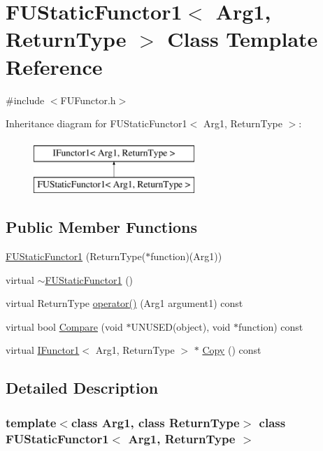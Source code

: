 \hypertarget{classFUStaticFunctor1}{
\section{FUStaticFunctor1$<$ Arg1, ReturnType $>$ Class Template Reference}
\label{classFUStaticFunctor1}
}


{\ttfamily \#include $<$FUFunctor.h$>$}

Inheritance diagram for FUStaticFunctor1$<$ Arg1, ReturnType $>$:\begin{figure}[H]
\begin{center}
\leavevmode
\includegraphics[height=2.000000cm]{classFUStaticFunctor1}
\end{center}
\end{figure}
\subsection*{Public Member Functions}
\begin{DoxyCompactItemize}
\item 
\hyperlink{classFUStaticFunctor1_afa89870510a8d861a9c643e264c98157}{FUStaticFunctor1} (ReturnType($\ast$function)(Arg1))
\item 
virtual \hyperlink{classFUStaticFunctor1_a3e7c645616689d2abcdfe1906f7d0c60}{$\sim$FUStaticFunctor1} ()
\item 
virtual ReturnType \hyperlink{classFUStaticFunctor1_a6ee09c72c947798281709ecbb4e19ed3}{operator()} (Arg1 argument1) const 
\item 
virtual bool \hyperlink{classFUStaticFunctor1_a43837001321ac327b060349410a57ecd}{Compare} (void $\ast$UNUSED(object), void $\ast$function) const 
\item 
virtual \hyperlink{classIFunctor1}{IFunctor1}$<$ Arg1, ReturnType $>$ $\ast$ \hyperlink{classFUStaticFunctor1_a7a6af8a4b650271122ef4d60e70081fe}{Copy} () const 
\end{DoxyCompactItemize}


\subsection{Detailed Description}
\subsubsection*{template$<$class Arg1, class ReturnType$>$ class FUStaticFunctor1$<$ Arg1, ReturnType $>$}

